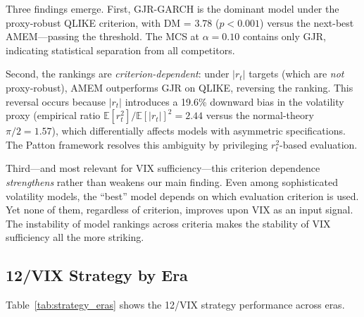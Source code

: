 \documentclass[12pt,a4paper]{article}
\begin{document}
Three findings emerge. First, GJR-GARCH is the dominant model under the proxy-robust QLIKE criterion, with DM = 3.78 ($p < 0.001$) versus the next-best AMEM---passing the \citet{harvey2016} threshold. The MCS at $\alpha = 0.10$ contains only GJR, indicating statistical separation from all competitors.

Second, the rankings are \emph{criterion-dependent}: under $|r_t|$ targets (which are \emph{not} proxy-robust), AMEM outperforms GJR on QLIKE, reversing the ranking. This reversal occurs because $|r_t|$ introduces a 19.6\% downward bias in the volatility proxy (empirical ratio $\mathbb{E}[r_t^2]/\mathbb{E}[|r_t|]^2 = 2.44$ versus the normal-theory $\pi/2 = 1.57$), which differentially affects models with asymmetric specifications. The Patton framework resolves this ambiguity by privileging $r_t^2$-based evaluation.

Third---and most relevant for VIX sufficiency---this criterion dependence \emph{strengthens} rather than weakens our main finding. Even among sophisticated volatility models, the ``best'' model depends on which evaluation criterion is used. Yet none of them, regardless of criterion, improves upon VIX as an input signal. The instability of model rankings across criteria makes the stability of VIX sufficiency all the more striking.

\subsection{12/VIX Strategy by Era}

Table~\ref{tab:strategy_eras} shows the 12/VIX strategy performance across eras.
\end{document}
